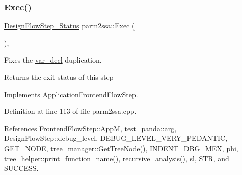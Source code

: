 \mbox{\label{classparm2ssa_ae308e612abcdd8e6cb9dcf490e774065}} 
\subsubsection{\texorpdfstring{Exec()}{Exec()}}
{\footnotesize\ttfamily \hyperlink{design__flow__step_8hpp_afb1f0d73069c26076b8d31dbc8ebecdf}{Design\+Flow\+Step\+\_\+\+Status} parm2ssa\+::\+Exec (\begin{DoxyParamCaption}{ }\end{DoxyParamCaption})\hspace{0.3cm}{\ttfamily [override]}, {\ttfamily [virtual]}}



Fixes the \hyperlink{structvar__decl}{var\+\_\+decl} duplication. 

\begin{DoxyReturn}{Returns}
the exit status of this step 
\end{DoxyReturn}


Implements \hyperlink{classApplicationFrontendFlowStep_a2bf060a5ebc1735635dc5c7773387a25}{Application\+Frontend\+Flow\+Step}.



Definition at line 113 of file parm2ssa.\+cpp.



References Frontend\+Flow\+Step\+::\+AppM, test\+\_\+panda\+::arg, Design\+Flow\+Step\+::debug\+\_\+level, D\+E\+B\+U\+G\+\_\+\+L\+E\+V\+E\+L\+\_\+\+V\+E\+R\+Y\+\_\+\+P\+E\+D\+A\+N\+T\+IC, G\+E\+T\+\_\+\+N\+O\+DE, tree\+\_\+manager\+::\+Get\+Tree\+Node(), I\+N\+D\+E\+N\+T\+\_\+\+D\+B\+G\+\_\+\+M\+EX, phi, tree\+\_\+helper\+::print\+\_\+function\+\_\+name(), recursive\+\_\+analysis(), sl, S\+TR, and S\+U\+C\+C\+E\+SS.

